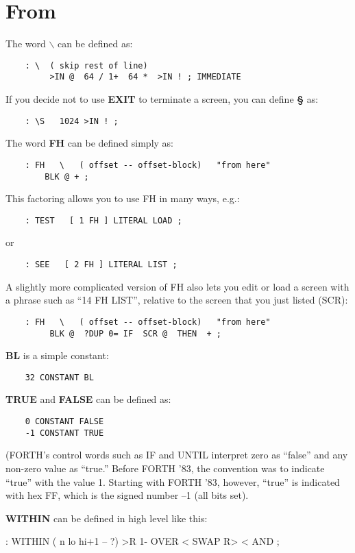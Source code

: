 \section{From }
The word {\bf $\backslash$} can be defined as:
\begin{verbatim}
    : \  ( skip rest of line)
         >IN @  64 / 1+  64 *  >IN ! ; IMMEDIATE
\end{verbatim}
If you decide not to use {\bf EXIT} to terminate a screen, you can define {\bf \S}
as:
\begin{verbatim}
    : \S   1024 >IN ! ;
\end{verbatim}
The word {\bf FH} can be defined simply as:
\begin{verbatim}
    : FH   \   ( offset -- offset-block)   "from here"
        BLK @ + ;
\end{verbatim}
This factoring allows you to use FH in many ways, e.g.:
\begin{verbatim}
    : TEST   [ 1 FH ] LITERAL LOAD ;
\end{verbatim}
or
\begin{verbatim}
    : SEE   [ 2 FH ] LITERAL LIST ;
\end{verbatim}
A slightly more complicated version of FH also lets you edit or load a 
screen with a phrase such as ``14 FH LIST'', relative to the screen that 
you just listed (SCR):
\begin{verbatim}
    : FH   \   ( offset -- offset-block)   "from here"
         BLK @  ?DUP 0= IF  SCR @  THEN  + ;
\end{verbatim}
{\bf BL} is a simple constant:
\begin{verbatim}
    32 CONSTANT BL
\end{verbatim}
{\bf TRUE} and {\bf FALSE} can be defined as:
\begin{verbatim}
    0 CONSTANT FALSE
    -1 CONSTANT TRUE
\end{verbatim}
(FORTH's control words such as IF and UNTIL interpret zero as ``false'' 
and any non-zero value as ``true.''  Before FORTH '83, the convention
was to indicate ``true'' with the value 1.  Starting with FORTH '83,
however, ``true'' is indicated with hex FF, which is the signed number --1
(all bits set).

{\bf WITHIN} can be defined in high level like this:
\begin{Code}
    : WITHIN  ( n lo hi+1 -- ?)
         >R  1- OVER <  SWAP R>  < AND ;
\end{Code}

